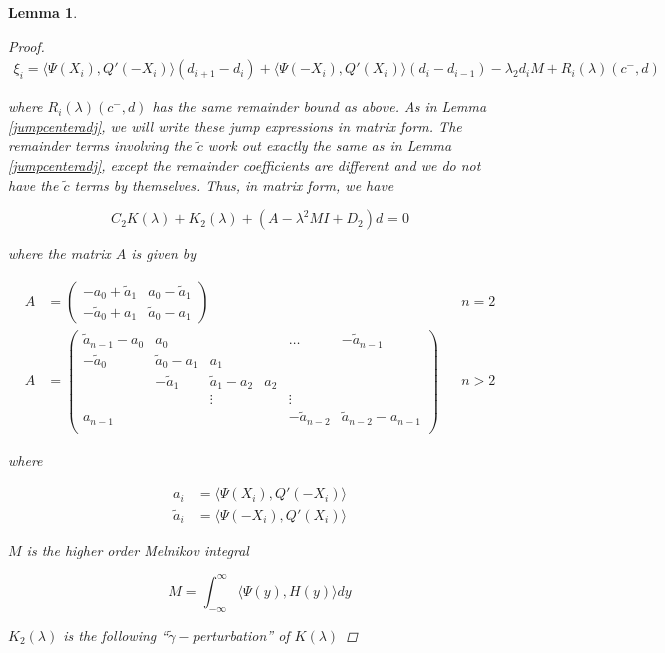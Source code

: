 \documentclass[12pt]{article}
\newtheorem{lemma}{Lemma}
\begin{document}
\begin{lemma}
\begin{proof}
\begin{align*}
\xi_i = \langle \Psi(X_i), Q'(-X_i) \rangle (d_{i+1} - d_i)
+ \langle \Psi(-X_i), Q'(X_i) \rangle (d_i - d_{i-1})
- \lambda_2 d_i M + R_i(\lambda)(c^-, d)
\end{align*}

where $R_i(\lambda)(c^-, d)$ has the same remainder bound as above. As in Lemma \ref{jumpcenteradj}, we will write these jump expressions in matrix form. The remainder terms involving the $\tilde{c}$ work out exactly the same as in Lemma \ref{jumpcenteradj}, except the remainder coefficients are different and we do not have the $\tilde{c}$ terms by themselves. Thus, in matrix form, we have

\[
C_2 K(\lambda) + K_2(\lambda) + (A - \lambda^2 M I + D_2)d = 0
\]

where the matrix $A$ is given by

\begin{align*}
A &= \begin{pmatrix}
-a_0 + \tilde{a}_1 & a_0 - \tilde{a}_1 \\
-\tilde{a}_0 + a_1 & \tilde{a}_0 - a_1
\end{pmatrix} && n = 2 \\
A &= \begin{pmatrix}
\tilde{a}_{n-1} - a_0 & a_0 & & & \dots & -\tilde{a}_{n-1}\\
-\tilde{a}_0 & \tilde{a}_0 - a_1 &  a_1 \\
& -\tilde{a}_1 & \tilde{a}_1 - a_2 &  a_2 \\
& & \vdots & & \vdots \\
a_{n-1} & & & & -\tilde{a}_{n-2} & \tilde{a}_{n-2} - a_{n-1} \\
\end{pmatrix} && n > 2
\end{align*}

where

\begin{align*}
a_i &= \langle \Psi(X_i), Q'(-X_i) \rangle \\
\tilde{a}_i &= \langle \Psi(-X_i), Q'(X_i) \rangle
\end{align*}

$M$ is the higher order Melnikov integral

\[
M = \int_{-\infty}^\infty \langle \Psi(y), H(y) \rangle dy
\]

$K_2(\lambda)$ is the following ``$\tilde{\gamma}-$perturbation'' of $K(\lambda)$ 


\end{proof}
\end{lemma}
\end{document}

